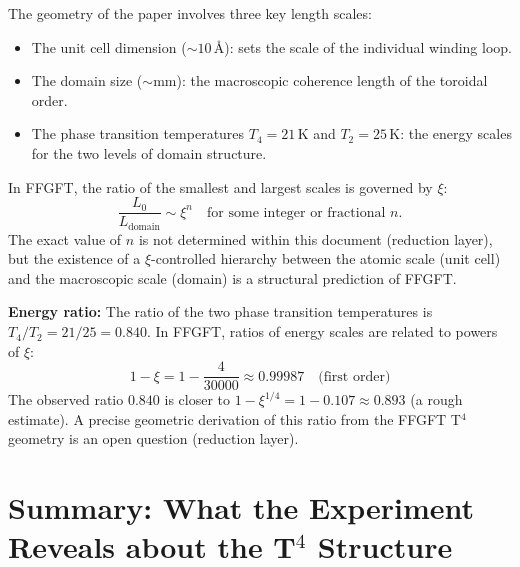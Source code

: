 The geometry of the paper involves three key length scales:
\begin{itemize}
  \item The unit cell dimension ($\sim 10$\,\AA): sets the scale of the
        individual winding loop.
  \item The domain size ($\sim$mm): the macroscopic coherence length of the
        toroidal order.
  \item The phase transition temperatures $T_4=21$\,K and $T_2=25$\,K:
        the energy scales for the two levels of domain structure.
\end{itemize}

\noindent In FFGFT, the ratio of the smallest and largest scales is governed
by $\xi$:
\[
  \frac{L_0}{L_{\mathrm{domain}}} \sim \xi^n
  \quad \text{for some integer or fractional } n.
\]
The exact value of $n$ is not determined within this document (reduction
layer), but the existence of a $\xi$-controlled hierarchy between the atomic
scale (unit cell) and the macroscopic scale (domain) is a structural
prediction of FFGFT.

\noindent\textbf{Energy ratio:} The ratio of the two phase transition
temperatures is $T_4/T_2 = 21/25 = 0.840$. In FFGFT, ratios of energy
scales are related to powers of $\xi$:
\[
  1 - \xi = 1 - \frac{4}{30000} \approx 0.99987
  \quad \text{(first order)}
\]
The observed ratio $0.840$ is closer to $1-\xi^{1/4} = 1 - 0.107 \approx
0.893$ (a rough estimate). A precise geometric derivation of this ratio
from the FFGFT T$^4$ geometry is an open question (reduction layer).

\section{Summary: What the Experiment Reveals about the T$^4$ Structure}

